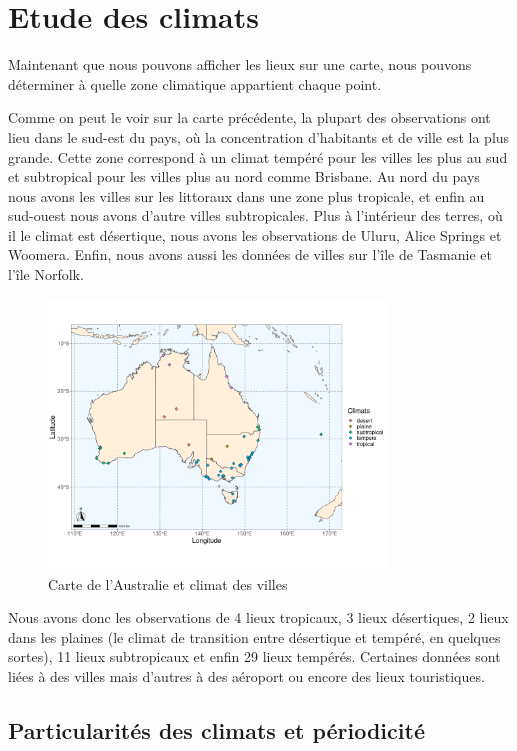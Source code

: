 \documentclass{article}
\begin{document}
\section{Etude des climats}

Maintenant que nous pouvons afficher les lieux sur une carte, nous pouvons déterminer à quelle zone climatique appartient chaque point.

Comme on peut le voir sur la carte précédente, la plupart des observations ont lieu dans le sud-est du pays, où la concentration d'habitants et de ville est la plus grande. Cette zone correspond à un climat tempéré pour les villes les plus au sud et subtropical pour les villes plus au nord comme Brisbane. Au nord du pays nous avons les villes sur les littoraux dans une zone plus tropicale, et enfin au sud-ouest nous avons d'autre villes subtropicales. Plus à l'intérieur des terres, où il le climat est désertique, nous avons les observations de Uluru, Alice Springs et Woomera. Enfin, nous avons aussi les données de villes sur l'île de Tasmanie et l'île Norfolk. 

\begin{figure}[H]
    \centering
    \includegraphics[width=0.8\textwidth]{Ressources/Australia_climates.png}
    \caption{Carte de l'Australie et climat des villes}
\end{figure}

Nous avons donc les observations de 4 lieux tropicaux, 3 lieux désertiques, 2 lieux dans les plaines (le climat de transition entre désertique et tempéré, en quelques sortes), 11 lieux subtropicaux et enfin 29 lieux tempérés. Certaines données sont liées à des villes mais d'autres à des aéroport ou encore des lieux touristiques.

\subsection{Particularités des climats et périodicité}
\end{document}

